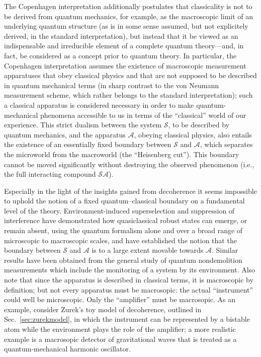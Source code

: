 \documentclass[twocolumn,rmp,aps,amsmath,amsfonts,noshowkeys,noshowpacs]{revtex4}
\begin{document}
The Copenhagen interpretation additionally postulates that
classicality is not to be derived from quantum mechanics, for example,
as the macroscopic limit of an underlying quantum structure (as is in
some sense assumed, but not explicitely derived, in the standard
interpretation), but instead that it be viewed as an indispensable and
irreducible element of a complete quantum theory---and, in fact, be
considered as a concept prior to quantum theory.  In particular, the
Copenhagen interpretation assumes the existence of macroscopic
measurement apparatuses that obey classical physics and that are not
supposed to be described in quantum mechanical terms (in sharp
contrast to the von Neumann measurement scheme, which rather belongs
to the standard interpretation); such a classical apparatus is
considered necessary in order to make quantum-mechanical phenomena
accessible to us in terms of the ``classical'' world of our
experience. This strict dualism between the system $\mathcal{S}$, to
be described by quantum mechanics, and the apparatus $\mathcal{A}$,
obeying classical physics, also entails the existence of an
essentially fixed boundary between $\mathcal{S}$ and $\mathcal{A}$,
which separates the microworld from the macroworld (the ``Heisenberg
cut''). This boundary cannot be moved significantly without destroying
the observed phenomenon (i.e., the full interacting compound
$\mathcal{SA}$).

Especially in the light of the insights gained from decoherence it
seems impossible to uphold the notion of a fixed quantum--classical
boundary on a fundamental level of the theory.  Environment-induced
superselection and suppression of interference have demonstrated how
quasiclassical robust states can emerge, or remain absent, using the
quantum formalism alone and over a broad range of microscopic to
macroscopic scales, and have established the notion that the boundary
between $\mathcal{S}$ and $\mathcal{A}$ is to a large extent movable
towards $\mathcal{A}$. Similar results have been obtained from the
general study of quantum nondemolition measurements \citep[see, for
example, Chap.~19 of][]{Auletta:2000:rv} which include the monitoring
of a system by its environment. Also note that since the apparatus is
described in classical terms, it is macroscopic by definition; but not
every apparatus must be macrosopic: the actual ``instrument'' could
well be microscopic. Only the ``amplifier'' must be macrosopic. As an
example, consider Zurek's \citeyearpar{Zurek:1981:dd} toy model of
decoherence, outlined in Sec.~\ref{sec:zurekmodel}, in which the
instrument can be represented by a bistable atom while the environment
plays the role of the amplifier; a more realistic example is a
macrosopic detector of gravitational waves that is treated as a
quantum-mechanical harmonic oscillator.
\end{document}
